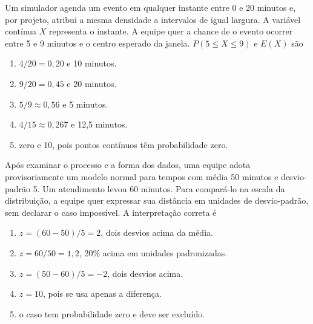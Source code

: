 \TextoBase Um simulador agenda um evento em qualquer instante entre 0 e 20 minutos e, por projeto, atribui a mesma densidade a intervalos de igual largura. A variável contínua $X$ representa o instante. A equipe quer a chance de o evento ocorrer entre 5 e 9 minutos e o centro esperado da janela.
\FonteDidatica
\Comando $P(5\leq X\leq9)$ e $E(X)$ são
\begin{enumerate}[label=\Alph*)]\item $4/20=0{,}20$ e 10 minutos.\item $9/20=0{,}45$ e 20 minutos.\item $5/9\approx0{,}56$ e 5 minutos.\item $4/15\approx0{,}267$ e 12,5 minutos.\item zero e 10, pois pontos contínuos têm probabilidade zero.\end{enumerate}

\TextoBase Após examinar o processo e a forma dos dados, uma equipe adota provisoriamente um modelo normal para tempos com média 50 minutos e desvio-padrão 5. Um atendimento levou 60 minutos. Para compará-lo na escala da distribuição, a equipe quer expressar sua distância em unidades de desvio-padrão, sem declarar o caso impossível.
\FonteDidatica
\Comando A interpretação correta é
\begin{enumerate}[label=\Alph*)]\item $z=(60-50)/5=2$, dois desvios acima da média.\item $z=60/50=1{,}2$, 20\% acima em unidades padronizadas.\item $z=(50-60)/5=-2$, dois desvios acima.\item $z=10$, pois se usa apenas a diferença.\item o caso tem probabilidade zero e deve ser excluído.\end{enumerate}

